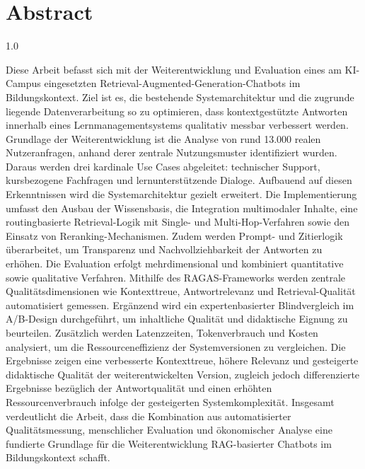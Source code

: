 \chapter*{Abstract}

\begin{spacing}{1.0}

Diese Arbeit befasst sich mit der Weiterentwicklung und Evaluation eines am KI-Campus eingesetzten Retrieval-Augmented-Generation-Chatbots im Bildungskontext.
Ziel ist es, die bestehende Systemarchitektur und die zugrunde liegende Datenverarbeitung so zu optimieren, dass kontextgestützte Antworten innerhalb eines Lernmanagementsystems qualitativ messbar verbessert werden.
Grundlage der Weiterentwicklung ist die Analyse von rund 13.000 realen Nutzeranfragen, anhand derer zentrale Nutzungsmuster identifiziert wurden.
Daraus werden drei kardinale Use Cases abgeleitet: technischer Support, kursbezogene Fachfragen und lernunterstützende Dialoge.
Aufbauend auf diesen Erkenntnissen wird die Systemarchitektur gezielt erweitert.
Die Implementierung umfasst den Ausbau der Wissensbasis, die Integration multimodaler Inhalte, eine routingbasierte Retrieval-Logik mit Single- und Multi-Hop-Verfahren sowie den Einsatz von Reranking-Mechanismen.
Zudem werden Prompt- und Zitierlogik überarbeitet, um Transparenz und Nachvollziehbarkeit der Antworten zu erhöhen.
Die Evaluation erfolgt mehrdimensional und kombiniert quantitative sowie qualitative Verfahren. Mithilfe des RAGAS-Frameworks werden zentrale Qualitätsdimensionen wie Kontexttreue, Antwortrelevanz und Retrieval-Qualität automatisiert gemessen. Ergänzend wird ein expertenbasierter Blindvergleich im A/B-Design durchgeführt, um inhaltliche Qualität und didaktische Eignung zu beurteilen. Zusätzlich werden Latenzzeiten, Tokenverbrauch und Kosten analysiert, um die Ressourceneffizienz der Systemversionen zu vergleichen. Die Ergebnisse zeigen eine verbesserte Kontexttreue, höhere Relevanz und gesteigerte didaktische Qualität der weiterentwickelten Version, zugleich jedoch differenzierte Ergebnisse bezüglich der Antwortqualität und einen erhöhten Ressourcenverbrauch infolge der gesteigerten Systemkomplexität.
Insgesamt verdeutlicht die Arbeit, dass die Kombination aus automatisierter Qualitätsmessung, menschlicher Evaluation und ökonomischer Analyse eine fundierte Grundlage für die Weiterentwicklung RAG-basierter Chatbots im Bildungskontext schafft.

\end{spacing}